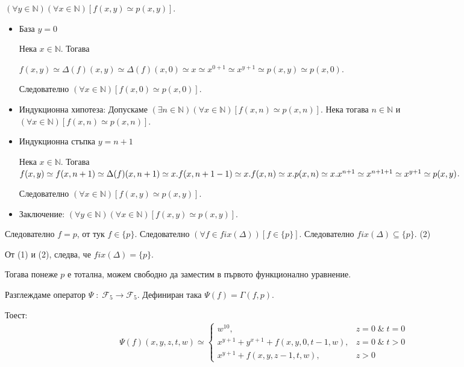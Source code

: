 \documentclass{article}
\begin{document}
\((\forall y \in \mathbb{N})(\forall x \in \mathbb{N})[f(x, y) \simeq p(x, y)]\).
\begin{itemize}
\item База \(y = 0\)

Нека \(x \in \mathbb{N}\). Тогава

\(f(x, y) \simeq \Delta(f)(x, y) \simeq \Delta(f)(x, 0) \simeq x \simeq x^{0 + 1} \simeq x^{y + 1} \simeq p(x, y) \simeq p(x, 0)\).

Следователно \((\forall x \in \mathbb{N})[f(x, 0) \simeq p(x, 0)]\).
\item Индукционна хипотеза: Допускаме \((\exists n \in \mathbb{N})(\forall x \in \mathbb{N})[f(x, n) \simeq p(x, n)]\).
Нека тогава \(n \in \mathbb{N}\) и \((\forall x \in \mathbb{N})[f(x, n) \simeq p(x, n)]\).
\item Индукционна стъпка \(y = n + 1\)

Нека \(x \in \mathbb{N}\). Тогава \(f(x, y) \simeq f(x, n + 1) \simeq \Delta(f)(x, n + 1) \simeq \\
x.f(x, n + 1 - 1) \simeq x.f(x, n) \simeq x.p(x, n) \simeq x.x^{n + 1} \simeq \\
x^{n + 1 + 1} \simeq x^{y + 1} \simeq p(x, y)\).

Следователно \((\forall x \in \mathbb{N})[f(x, y) \simeq p(x, y)]\).
\item Заключение: \((\forall y \in \mathbb{N})(\forall x \in \mathbb{N})[f(x, y) \simeq p(x, y)]\).
\end{itemize}
Следователно \(f = p\), от тук \(f \in \{p\}\).
Следователно \((\forall f \in fix(\Delta))[f \in \{p\}]\).
Следователно \(fix(\Delta) \subseteq \{p\}\). (2)

От (1) и (2), следва, че \(fix(\Delta) = \{p\}\).

Тогава понеже \(p\) е тотална, можем свободно да заместим в първото функционално уравнение.

Разглеждаме оператор \(\Psi \; : \; \mathcal{F}_5 \to \mathcal{F}_5\). Дефиниран така \(\Psi(f) = \Gamma(f, p)\).

Тоест: 
\begin{align*}
\Psi(f)(x, y, z, t, w) \simeq \begin{cases}
w^{10}, & z = 0 \; \& \; t = 0 \\
x^{y + 1} + y^{x + 1} + f(x, y, 0, t - 1, w), & z = 0 \; \& \; t > 0 \\
x^{y + 1} + f(x, y, z - 1, t, w), & z > 0
\end{cases}
\end{align*}
\end{document}
